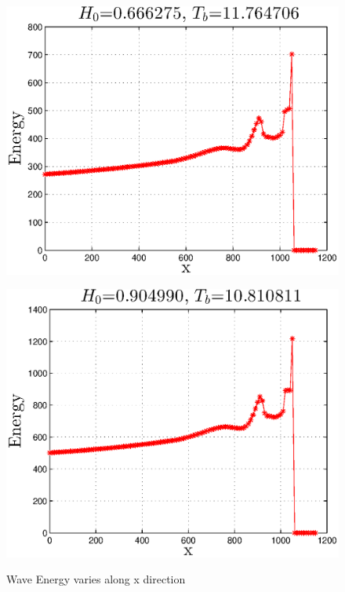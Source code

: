 
\begin{figure}[h]
\begin{minipage}[b]{0.47\linewidth}
\centering
\includegraphics[width=\textwidth]{forward_plot/p1_3.eps}
\label{Figenergy_1}
\end{minipage}
\hspace{0.2cm}
\begin{minipage}[b]{0.47\linewidth}
\centering
\includegraphics[width=\textwidth]{forward_plot/p2_3.eps}
\label{Figenergy_2}
\end{minipage}
\caption{Wave Energy varies along x direction}
\end{figure}

